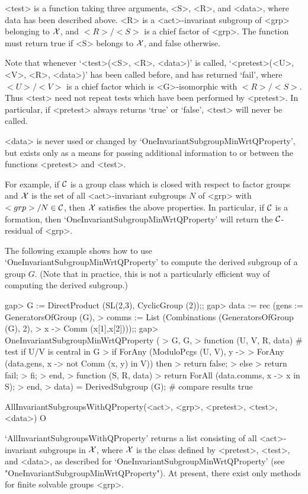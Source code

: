 <test> is a function taking three arguments, <S>, <R>, and <data>, where
data has been described above. <R> is a <act>-invariant subgroup of <grp> belonging to
$\cal X$, and $<R>/<S>$ is a chief factor of <grp>. The function must return
true if <S> belongs to $\cal X$, and false otherwise. 

Note that whenever `<test>(<S>, <R>, <data>)' is called, 
`<pretest>(<U>, <V>, <R>, <data>)' has been called before, and has returned
`fail', where  $<U>/<V>$ is a  chief factor which is <G>-isomorphic with
$<R>/<S>$. Thus <test> need not repeat tests which have been performed by
<pretest>. In particular, if <pretest> always returns `true' or `false',
<test> will never be called.

<data> is never used or changed by `OneInvariantSubgroupMinWrtQProperty', but
exists only as a means for passing additional information to or between
the functions <pretest> and <test>.

For example, if $\cal C$ is a group class which is closed with respect to
factor groups and $\cal X$ is the set of all <act>-invariant subgroups $N$ of <grp>
with $<grp>/N \in \cal C$, then $\cal X$ satisfies the above properties. In
particular, if $\cal C$ is a formation, then
`OneInvariantSubgroupMinWrtQProperty' will return the $\cal C$-residual of
<grp>.

The following example shows how to use `OneInvariantSubgroupMinWrtQProperty' to
compute the derived subgroup of a group $G$. (Note that in practice, this 
is not a particularly efficient way of computing the derived subgroup.)

\beginexample
gap> G := DirectProduct (SL(2,3), CyclicGroup (2));;
gap> data := rec (gens := GeneratorsOfGroup (G),
>    comms := List (Combinations (GeneratorsOfGroup (G), 2), 
>       x -> Comm (x[1],x[2])));;
gap> OneInvariantSubgroupMinWrtQProperty (
>    G, G,
>    function (U, V, R, data) # test if U/V is central in G
>        if ForAny (ModuloPcgs (U, V), y ->
>           ForAny (data.gens, x -> not Comm (x, y) in V)) then 
>           return false;
>        else
>           return fail;
>        fi;
>     end,
>     function (S, R, data)
>        return ForAll (data.comms, x -> x in S);
>     end,
>     data) = DerivedSubgroup (G); # compare results
true
\endexample       


\>AllInvariantSubgroupsWithQProperty(<act>, <grp>, <pretest>, <test>, <data>) O

`AllInvariantSubgroupsWithQProperty' returns a list consisting of all 
<act>-invariant subgroups in $\cal X$, where $\cal X$ is the class defined by <pretest>,
<test>, and <data>, as described for `OneInvariantSubgroupMinWrtQProperty' (see
"OneInvariantSubgroupMinWrtQProperty"). 
At present, there exist only methods for finite solvable groups <grp>.

